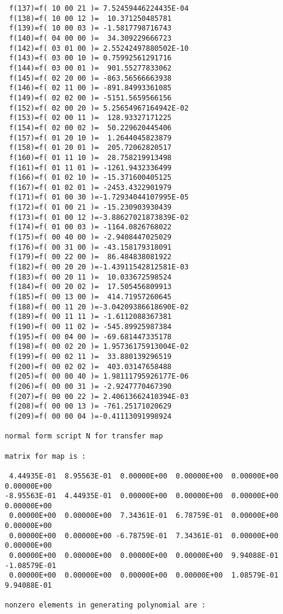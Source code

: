 \begin{footnotesize}
\begin{verbatim}
 f(137)=f( 10 00 21 )= 7.52459446224435E-04
 f(138)=f( 10 00 12 )=  10.371250485781
 f(139)=f( 10 00 03 )= -1.5817798716743
 f(140)=f( 04 00 00 )=  34.309229666723
 f(142)=f( 03 01 00 )= 2.55242497880502E-10
 f(143)=f( 03 00 10 )= 0.75992561291716
 f(144)=f( 03 00 01 )=  901.55277833062
 f(145)=f( 02 20 00 )= -863.56566663938
 f(146)=f( 02 11 00 )= -891.84993361085
 f(149)=f( 02 02 00 )= -5151.5659566156
 f(152)=f( 02 00 20 )= 5.25654967164942E-02
 f(153)=f( 02 00 11 )=  128.93327171225
 f(154)=f( 02 00 02 )=  50.229620445406
 f(157)=f( 01 20 10 )=  1.2644045823879
 f(158)=f( 01 20 01 )=  205.72062820517
 f(160)=f( 01 11 10 )=  28.758219913498
 f(161)=f( 01 11 01 )= -1261.9432336499
 f(166)=f( 01 02 10 )= -15.371600405125
 f(167)=f( 01 02 01 )= -2453.4322901979
 f(171)=f( 01 00 30 )=-1.72934044107995E-05
 f(172)=f( 01 00 21 )= -15.230903930439
 f(173)=f( 01 00 12 )=-3.88627021873839E-02
 f(174)=f( 01 00 03 )= -1164.0826768022
 f(175)=f( 00 40 00 )= -2.9408447025029
 f(176)=f( 00 31 00 )= -43.158179318091
 f(179)=f( 00 22 00 )=  86.484838081922
 f(182)=f( 00 20 20 )=-1.43911542812581E-03
 f(183)=f( 00 20 11 )=  10.033672598524
 f(184)=f( 00 20 02 )=  17.505456809913
 f(185)=f( 00 13 00 )=  414.71957260645
 f(188)=f( 00 11 20 )=-3.04209386618690E-02
 f(189)=f( 00 11 11 )= -1.6112088367381
 f(190)=f( 00 11 02 )= -545.89925987384
 f(195)=f( 00 04 00 )= -69.681447335178
 f(198)=f( 00 02 20 )= 1.95736175913004E-02
 f(199)=f( 00 02 11 )=  33.880139296519
 f(200)=f( 00 02 02 )=  403.03147658488
 f(205)=f( 00 00 40 )= 1.98111795926177E-06
 f(206)=f( 00 00 31 )= -2.9247770467390
 f(207)=f( 00 00 22 )= 2.40613662410394E-03
 f(208)=f( 00 00 13 )= -761.25171020629
 f(209)=f( 00 00 04 )=-0.41113091998924

normal form script N for transfer map

matrix for map is :

 4.44935E-01  8.95563E-01  0.00000E+00  0.00000E+00  0.00000E+00  0.00000E+00
-8.95563E-01  4.44935E-01  0.00000E+00  0.00000E+00  0.00000E+00  0.00000E+00
 0.00000E+00  0.00000E+00  7.34361E-01  6.78759E-01  0.00000E+00  0.00000E+00
 0.00000E+00  0.00000E+00 -6.78759E-01  7.34361E-01  0.00000E+00  0.00000E+00
 0.00000E+00  0.00000E+00  0.00000E+00  0.00000E+00  9.94088E-01 -1.08579E-01
 0.00000E+00  0.00000E+00  0.00000E+00  0.00000E+00  1.08579E-01  9.94088E-01

nonzero elements in generating polynomial are :


\end{verbatim}
\end{footnotesize}
